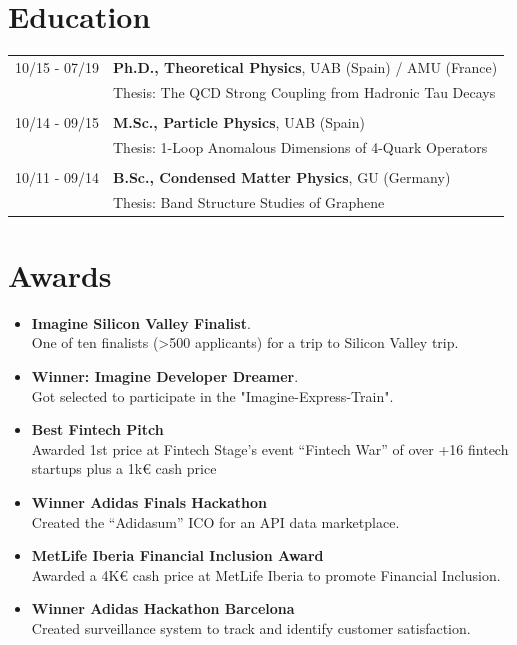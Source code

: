 \documentclass[11pt]{article}
\begin{document}
\section*{Education}
\begin{tabularx}{\textwidth}{lX}
  10/15 - 07/19 & \textbf{Ph.D., Theoretical Physics}, UAB (Spain) / AMU (France) \\
                & Thesis: The QCD Strong Coupling from Hadronic Tau
  Decays                                                                          \\\\
  10/14 - 09/15 & \textbf{M.Sc., Particle Physics}, UAB (Spain)                   \\
                & Thesis: 1-Loop Anomalous Dimensions of 4-Quark
  Operators                                                                       \\\\
  10/11 - 09/14 & \textbf{B.Sc., Condensed Matter Physics}, GU (Germany)          \\
                & Thesis: Band Structure Studies of Graphene
\end{tabularx}

\section*{Awards}
\begin{itemize}
  \item \textbf{Imagine Silicon Valley Finalist}. \\
        One of ten finalists (>500 applicants) for a trip to Silicon Valley trip.
  \item \textbf{Winner: Imagine Developer Dreamer}. \\
        Got selected to participate in the "Imagine-Express-Train".
  \item \textbf{Best Fintech Pitch} \\
        Awarded 1st price at Fintech Stage's event ``Fintech War'' of over
        +16 fintech startups plus a 1k€ cash price
  \item \textbf{Winner Adidas Finals Hackathon} \\
        Created the ``Adidasum'' ICO for an API data marketplace.
  \item \textbf{MetLife Iberia Financial Inclusion Award} \\
        Awarded a 4K€ cash price at MetLife Iberia to promote Financial Inclusion.
  \item \textbf{Winner Adidas Hackathon Barcelona} \\
        Created surveillance system to track and identify customer satisfaction.
\end{itemize}
\end{document}
